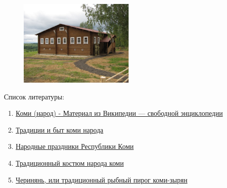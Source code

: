 \documentclass[a4paper,14pt]{extarticle}
\begin{document}
	\begin{figure}[h]
		\centering
		\includegraphics[width=0.5\textwidth]{images/h}
	\end{figure}
	
	\pagebreak
	Список литературы:
	
	\begin{enumerate}
		\item \href{https://ru.wikipedia.org/wiki/%D0%9A%D0%BE%D0%BC%D0%B8_(%D0%BD%D0%B0%D1%80%D0%BE%D0%B4)}{Коми (народ) - Материал из Википедии — свободной энциклопедии}
		
		\item \href{https://www.visitkomi.ru/region/tradicii_byt/}{Традиции и быт коми народа}
		
		\item \href{https://kraeveds.wixsite.com/mykrayrodnoy/komi-prazdniki}{Народные праздники Республики Коми}
		
		\item \href{https://arctic-children.com/article/pas-sarapan-i-toboki/}{Традиционный костюм народа коми}
		
		\item \href{https://eda.ru/recepty/vypechka-deserty/cherinyan-ili-tradicionnyy-rybnyy-pirog-komi-zyryan-125079}{Черинянь, или традиционный рыбный пирог коми-зырян}
	\end{enumerate}
\end{document}
